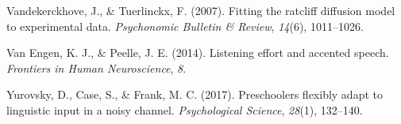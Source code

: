 \documentclass[10pt, letterpaper]{article}
\begin{document}
\leavevmode\hypertarget{ref-vandekerckhove2007fitting}{}%
Vandekerckhove, J., \& Tuerlinckx, F. (2007). Fitting the ratcliff
diffusion model to experimental data. \emph{Psychonomic Bulletin \&
Review}, \emph{14}(6), 1011--1026.

\leavevmode\hypertarget{ref-van2014listening}{}%
Van Engen, K. J., \& Peelle, J. E. (2014). Listening effort and accented
speech. \emph{Frontiers in Human Neuroscience}, \emph{8}.

\leavevmode\hypertarget{ref-yurovsky2017preschoolers}{}%
Yurovsky, D., Case, S., \& Frank, M. C. (2017). Preschoolers flexibly
adapt to linguistic input in a noisy channel. \emph{Psychological
Science}, \emph{28}(1), 132--140.
\end{document}
